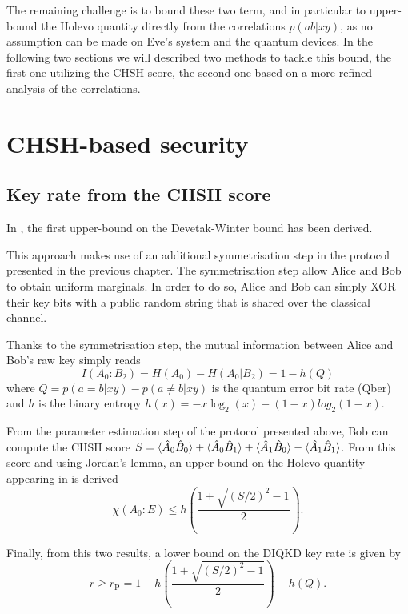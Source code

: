 The remaining challenge is to bound these two term, and in particular to upper-bound the Holevo quantity directly from the correlations $p(ab|xy)$, as no assumption can be made on Eve's system and the quantum devices. 
In the following two sections we will described two methods to tackle this bound, the first one utilizing the CHSH score, the second one based on a more refined analysis of the correlations.

\section{CHSH-based security}

\subsection{Key rate from the CHSH score}
\label{sec:pironio}

In \cite{Pironio2009}, the first upper-bound on the Devetak-Winter bound has been derived.

This approach makes use of an additional symmetrisation step in the protocol presented in the previous chapter.
The symmetrisation step allow Alice and Bob to obtain uniform marginals.
In order to do so, Alice and Bob can simply XOR their key bits with a public random string that is shared over the classical channel.

Thanks to the symmetrisation step, the mutual information between Alice and Bob's raw key simply reads
\begin{equation}
	I(A_0 : B_2) = H(A_0) - H(A_0|B_2) = 1 - h(Q)
\end{equation}
where $Q=p(a=b|xy)-p(a\neq b |xy)$ is the quantum error bit rate (Qber) and $h$ is the binary entropy $h(x)=-x \log_2(x) - (1-x)log_2(1-x)$.

From the parameter estimation step of the protocol presented above, Bob can compute the CHSH score $S=\langle {\hat{A}_0 \hat{B}_0} \rangle + \langle {\hat{A}_0 \hat{B}_1} \rangle + \langle {\hat{A}_1 \hat{B}_0} \rangle - \langle {\hat{A}_1 \hat{B}_1} \rangle$.
From this score and using Jordan's lemma, an upper-bound on the Holevo quantity appearing in  is derived
\begin{equation}
	\chi(A_0 : E) \leq h\left(\frac{1+\sqrt{(S/2)^2-1}}{2} \right).
	\label{eq:holevo_pironio}
\end{equation}

Finally, from this two results, a lower bound on the DIQKD key rate is given by
\begin{equation}
	r \geq r_\mathrm{P} = 1 - h\left(\frac{1+\sqrt{(S/2)^2-1}}{2} \right) - h(Q).
	\label{eq:pironio}
\end{equation}

